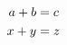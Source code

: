 \documentclass[12pt,border=2pt,preview]{standalone}
\begin{document}
\begin{align*}
\color{black}a+b &\color{black}= c \\
\color{black}x+y &\color{black}= z
\end{align*}
\end{document}
